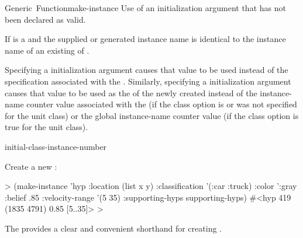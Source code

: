 \documentclass[10pt,twoside,english,pdftex]{article}
\begin{document}
\begin{functiondoc}{Generic~Function}{make-instance}{
     
     
    \returns{} }
\fnerrors
Use of an initialization argument that has not been declared as valid.

If  is a  and the supplied or generated
instance name is identical to the instance name of an existing
 of .

%
%
%
%
%
\fndescription 
%
Specifying a  initialization argument causes
that value to be used instead of the 
specification associated with the . Similarly, specifying a
 initialization argument causes that value to be
used as the  of the newly created 
instead of the instance-name counter value associated with the
 (if the 
class option is \nil{} or was not specified for the unit class) or the global
instance-name counter value (if the
 class option is true for the
unit class).

\begin{alsos}{initial-class-instance-number}
\end{alsos}

\fnexample
Create a new  :
%
\W\supp
\begin{example}
  > (make-instance 'hyp 
       :location (list x y)
       :classification '(:car :truck)
       :color ':gray
       :belief .85
       :velocity-range '(5 35)
       :supporting-hyps supporting-hyps)
  #<hyp 419 (1835 4791) 0.85 [5..35]>
  >
\end{example}

\fnnote {}%
The  
provides a clear and convenient shorthand for creating
.

\end{functiondoc}

\end{document}
